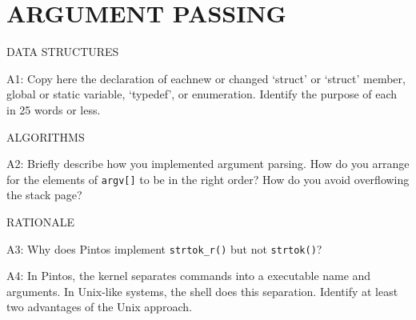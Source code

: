 
\section{ARGUMENT PASSING}

\begin{aspect}{DATA STRUCTURES}
	\begin{qc}
		A1: Copy here the declaration of eachnew or changed
		`struct' or `struct' member, global or static variable, `typedef', or enumeration.
		Identify the purpose of each in 25 words or less.
	\end{qc}
\end{aspect}

\begin{aspect}{ALGORITHMS}
	\begin{qc}
		A2: Briefly describe how you implemented argument parsing.
		How do you arrange for the elements of \lstinline{argv[]} to be in the right order?
		How do you avoid overflowing the stack page?
	\end{qc}
\end{aspect}

\begin{aspect}{RATIONALE}
	\begin{qc}
		A3: Why does Pintos implement \lstinline{strtok_r()} but not \lstinline{strtok()}?
	\end{qc}

	\begin{qc}
		A4: In Pintos, the kernel separates commands into a executable name and arguments.
		In Unix-like systems, the shell does this separation.
		Identify at least two advantages of the Unix approach.
	\end{qc}
\end{aspect}
